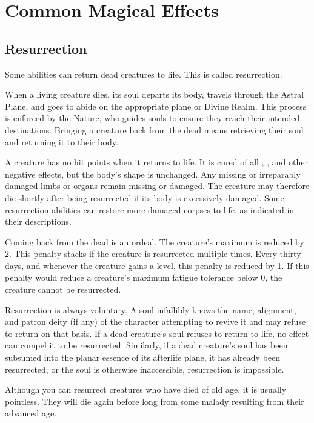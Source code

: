 \section{Common Magical Effects}

  \subsection{Resurrection}\label{Resurrection}
    Some abilities can return dead creatures to life.
    This is called resurrection.

    When a living creature dies, its soul departs its body, travels through the Astral Plane, and goes to abide on the appropriate plane or Divine Realm.
    This process is enforced by the Nature, who guides souls to ensure they reach their intended destinations.
    Bringing a creature back from the dead means retrieving their soul and returning it to their body.

    A creature has no hit points when it returns to life.
    It is cured of all , , and other negative effects, but the body's shape is unchanged.
    Any missing or irreparably damaged limbs or organs remain missing or damaged.
    The creature may therefore die shortly after being resurrected if its body is excessively damaged.
    Some resurrection abilities can restore more damaged corpses to life, as indicated in their descriptions.

    Coming back from the dead is an ordeal.
    The creature's maximum  is reduced by 2.
    This penalty stacks if the creature is resurrected multiple times.
    Every thirty days, and whenever the creature gains a level, this penalty is reduced by 1.
    If this penalty would reduce a creature's maximum fatigue tolerance below 0, the creature cannot be resurrected.

    Resurrection is always voluntary.
    A soul infallibly knows the name, alignment, and patron deity (if any) of the character attempting to revive it and may refuse to return on that basis.
    If a dead creature's soul refuses to return to life, no effect can compel it to be resurrected.
    Similarly, if a dead creature's soul has been subsumed into the planar essence of its afterlife plane, it has already been resurrected, or the soul is otherwise inaccessible, resurrection is impossible.

    Although you can resurrect creatures who have died of old age, it is usually pointless.
    They will die again before long from some malady resulting from their advanced age.


